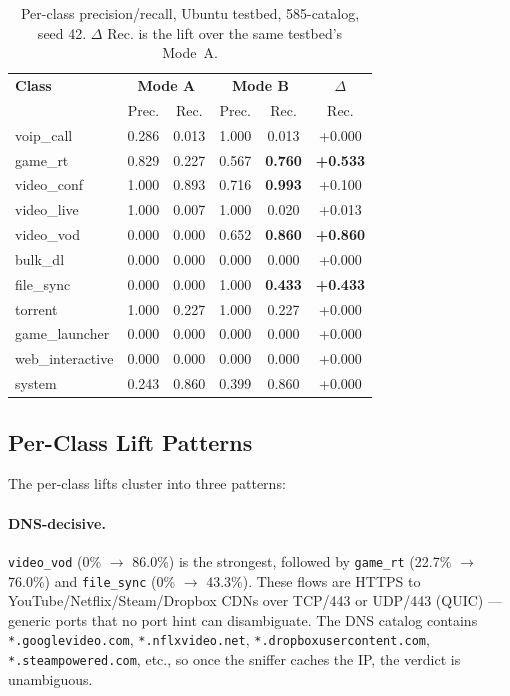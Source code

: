 \documentclass[11pt,a4paper]{article}
\begin{document}
\begin{table}[h]
\centering
\caption{Per-class precision/recall, Ubuntu testbed, 585-catalog,
seed 42. $\Delta$ Rec. is the lift over the same testbed's Mode~A.}
\label{tab:perclass-final}
\begin{tabular}{l|cc|cc|c}
\toprule
\textbf{Class} & \multicolumn{2}{c|}{\textbf{Mode A}} & \multicolumn{2}{c|}{\textbf{Mode B}} & $\Delta$ \\
 & Prec. & Rec. & Prec. & Rec. & Rec. \\
\midrule
voip\_call        & 0.286 & 0.013 & 1.000 & 0.013 & +0.000 \\
game\_rt          & 0.829 & 0.227 & 0.567 & \textbf{0.760} & \textbf{+0.533} \\
video\_conf       & 1.000 & 0.893 & 0.716 & \textbf{0.993} & +0.100 \\
video\_live       & 1.000 & 0.007 & 1.000 & 0.020 & +0.013 \\
video\_vod        & 0.000 & 0.000 & 0.652 & \textbf{0.860} & \textbf{+0.860} \\
bulk\_dl          & 0.000 & 0.000 & 0.000 & 0.000 & +0.000 \\
file\_sync        & 0.000 & 0.000 & 1.000 & \textbf{0.433} & \textbf{+0.433} \\
torrent           & 1.000 & 0.227 & 1.000 & 0.227 & +0.000 \\
game\_launcher    & 0.000 & 0.000 & 0.000 & 0.000 & +0.000 \\
web\_interactive  & 0.000 & 0.000 & 0.000 & 0.000 & +0.000 \\
system            & 0.243 & 0.860 & 0.399 & 0.860 & +0.000 \\
\bottomrule
\end{tabular}
\end{table}

\subsection{Per-Class Lift Patterns}

The per-class lifts cluster into three patterns:

\paragraph{DNS-decisive.}
\texttt{video\_vod} (0\% $\rightarrow$ 86.0\%) is the strongest,
followed by \texttt{game\_rt} (22.7\% $\rightarrow$ 76.0\%) and
\texttt{file\_sync} (0\% $\rightarrow$ 43.3\%). These flows are HTTPS
to YouTube/Netflix/Steam/Dropbox CDNs over TCP/443 or UDP/443 (QUIC) —
generic ports that no port hint can disambiguate. The DNS catalog
contains \texttt{*.googlevideo.com}, \texttt{*.nflxvideo.net},
\texttt{*.dropboxusercontent.com}, \texttt{*.steampowered.com}, etc.,
so once the sniffer caches the IP, the verdict is unambiguous.
\end{document}
